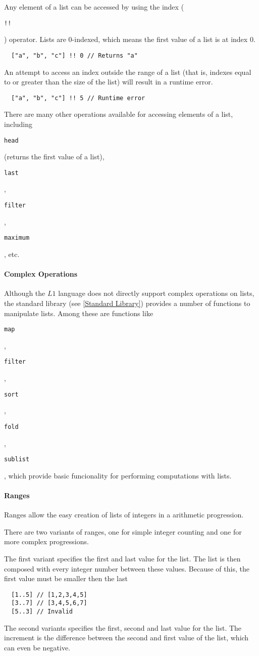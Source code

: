 \documentclass{article}
\def\code#1{\begin{footnotesize}\texttt{#1}\end{footnotesize}}
\begin{document}
Any element of a list can be accessed by using the index (\code{!!}) operator.
Lists are 0-indexed, which means the first value of a list is at index 0.

\begin{lstlisting}
  ["a", "b", "c"] !! 0 // Returns "a"
\end{lstlisting}

An attempt to access an index outside the range of a list (that is, indexes equal to or greater than the size of the list) will result in a runtime error.

\begin{lstlisting}
  ["a", "b", "c"] !! 5 // Runtime error
\end{lstlisting}

There are many other operations available for accessing elements of a list, including \code{head} (returns the first value of a list), \code{last}, \code{filter}, \code{maximum}, etc.

\paragraph{Complex Operations}
Although the $L1$ language does not directly support complex operations on lists, the standard library (see \ref{Standard Library}) provides a number of functions to manipulate lists.
Among these are functions like \code{map}, \code{filter}, \code{sort}, \code{fold}, \code{sublist}, which provide basic funcionality for performing computations with lists.

\paragraph{Ranges}
Ranges allow the easy creation of lists of integers in a arithmetic progression.

There are two variants of ranges, one for simple integer counting and one for more complex progressions.

The first variant specifies the first and last value for the list.
The list is then composed with every integer number between these values.
Because of this, the first value must be smaller then the last

\begin{lstlisting}
  [1..5] // [1,2,3,4,5]
  [3..7] // [3,4,5,6,7]
  [5..3] // Invalid
\end{lstlisting}

The second variants specifies the first, second and last value for the list.
The increment is the difference between the second and first value of the list, which can even be negative.
\end{document}
